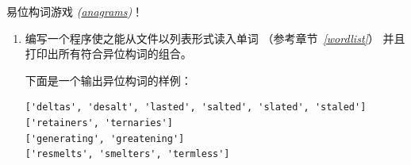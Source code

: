 \begin{exercise}
\label{anagrams}
  

易位构词游戏 {\em (\href{https://zh.wikipedia.org/wiki/%E6%98%93%E4%BD%8D%E6%9E%84%E8%AF%8D%E6%B8%B8%E6%88%8F}{anagrams})}！

\begin{enumerate}




\item 编写一个程序使之能从文件以列表形式读入单词 （参考章节~{\em \ref{wordlist}}） 并且打印出所有符合异位构词的组合。

下面是一个输出异位构词的样例：

{\em
\begin{lstlisting}
['deltas', 'desalt', 'lasted', 'salted', 'slated', 'staled']
['retainers', 'ternaries']
['generating', 'greatening']
['resmelts', 'smelters', 'termless']
\end{lstlisting}
}


\end{enumerate}
\end{exercise}

